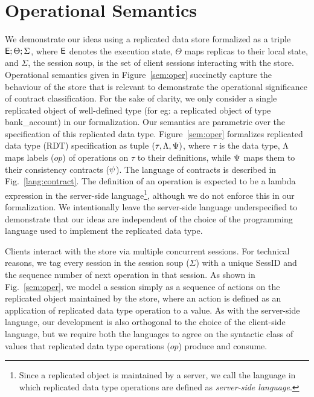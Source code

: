 \section{Operational Semantics}
\label{sec:core-opsem}

We demonstrate our ideas using a replicated data store formalized as a
triple ${\normalfont \textsf{E}};\Theta;\Sigma$, where ${\normalfont \textsf{E}}$ denotes the execution state,
$\Theta$ maps replicas to their local state, and $\Sigma$, the session
soup, is the set of client sessions interacting with the store.
Operational semantics given in Figure~\ref{sem:oper} succinctly
capture the behaviour of the store that is relevant to demonstrate the
operational significance of contract classification. For the sake of
clarity, we only consider a single replicated object of well-defined
type (for eg: a replicated object of type {\sf bank\_account}) in our
formalization.  Our semantics are parametric over the specification of
this replicated data type.  Figure~\ref{sem:oper} formalizes
replicated data type (RDT) specification as tuple
$(\tau,\Lambda,\Psi)$, where $\tau$ is the data type, $\Lambda$ maps
labels ($op$) of operations on $\tau$ to their definitions, while
$\Psi$ maps them to their consistency contracts ($\psi$). The language of
contracts is described in Fig.~\ref{lang:contract}. The definition of
an operation is expected to be a lambda expression in the server-side
language\footnote{Since a replicated object is maintained by a
server, we call the language in which replicated data type operations
are defined as \emph{server-side language}.}, although we do not
enforce this in our formalization. We intentionally leave the
server-side language underspecified to demonstrate that our ideas are
independent of the choice of the programming language used to
implement the replicated data type. 



Clients interact with the store via multiple concurrent sessions. For
technical reasons, we tag every session in the session soup ($\Sigma$)
with a unique {\sf SessID} and the sequence number of next operation
in that session. As shown in Fig.~\ref{sem:oper}, we model a session
simply as a sequence of actions on the replicated object maintained by
the store, where an action is defined as an application of replicated
data type operation to a value. As with the server-side language, our
development is also orthogonal to the choice of the client-side
language, but we require both the languages to agree on the syntactic
class of values that replicated data type operations ($op$) produce
and consume. 

